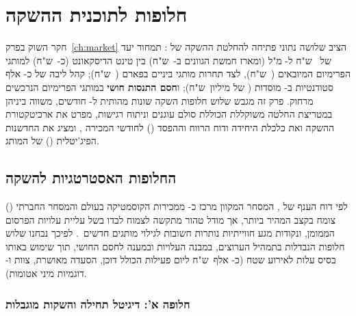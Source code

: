 \chapter{חלופות לתוכנית ההשקה}
\label{ch:alternatives}

חקר השוק בפרק~\ref{ch:market} הציב שלושה נתוני פתיחה להחלטת ההשקה של
: תמחור יעד של ~ש"ח ל- מ"ל (ומארז חמשת הגוונים
ב-~ש"ח) בין טינט הדיסקאונט (כ-~ש"ח) למותגי הפרימיום המיובאים
(~ש"ח), לצד תחרות מותגי ביניים בפארם (~ש"ח); קהל
ליבה של כ- אלף סטודנטיות ב- מוסדות ( של 
מיליון~ש"ח); ו\textbf{חסם התנסות חושי} במותגי הפרימיום הנרכשים מרחוק. פרק זה
מגבש שלוש חלופות השקה שונות מהותית ל- חודשים, משווה ביניהן במטריצת
החלטה משוקללת הכוללת סולם עוגנים וניתוח רגישות, מפרט את ארכיטקטורת ההשקה
ואת כלכלת היחידה ודוח הרווח וההפסד () לחודשי המכירה ,
ומציג את החדשנות הפיג'יטלית () של המותג.

\section{החלופות האסטרטגיות להשקה}
\label{sec:alt-options}

לפי דוח הענף  של , המסחר המקוון מרכז
כ- ממכירות הקוסמטיקה בעולם והמסחר החברתי () צומח
בקצב המהיר ביותר, אך מודל  טהור מתקשה לצמוח לבדו בשל עליית עלויות
הפרסום הממומן, ונקודות מגע חווייתיות נותרות חשובות לגילוי מותגים
חדשים~\cite{mckinsey2025beauty}. לפיכך נבחנו שלוש חלופות הנבדלות בתמהיל הערוצים,
במבנה העלויות ובמענה לחסם החושי, תוך שימוש באותו בסיס עלות לאירוע שטח
(כ- אלף~ש"ח ליום פעילות הכולל דוכן, הסעדה מאושרת, צוות ו-
דוגמיות מיני אטומות).

\subsection{חלופה א': דיגיטל תחילה והשקות מוגבלות}
\label{subsec:alt-digital}

